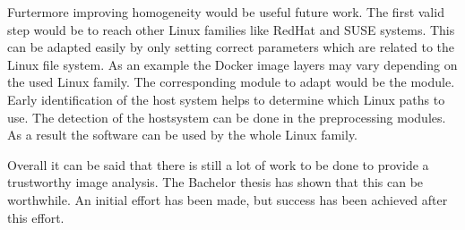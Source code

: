 Furtermore improving homogeneity would be useful future work.
The first valid step would be to reach other Linux families like RedHat and SUSE systems.
This can be adapted easily by only setting correct parameters which are related to the Linux file system.
As an example the Docker image layers may vary depending on the used Linux family.
The corresponding module to adapt would be the module.
Early identification of the host system helps to determine which Linux paths to use.
The detection of the hostsystem can be done in the preprocessing modules.
As a result the software can be used by the whole Linux family.

Overall it can be said that there is still a lot of work to be done to provide a trustworthy image analysis.
The Bachelor thesis has shown that this can be worthwhile.
An initial effort has been made, but success has been achieved after this effort.